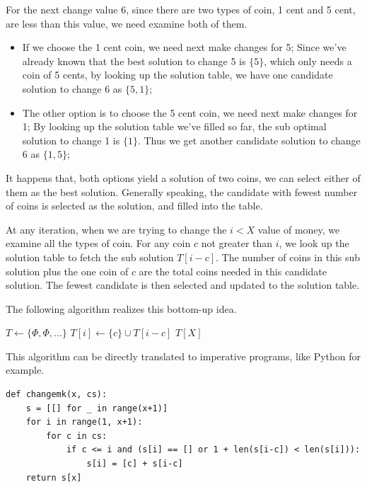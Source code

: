 \documentclass[UTF8]{article}
\begin{document}
For the next change value 6, since there are two types of coin, 1 cent
and 5 cent, are less than this value, we need examine both of them.
\begin{itemize}
\item If we choose the 1 cent coin, we need next make changes for 5; Since
we've already known that the best solution to change 5 is $\{ 5 \}$,
which only needs a coin of 5 cents, by looking up the solution table,
we have one candidate solution to change 6 as $\{5, 1\}$;
\item The other option is to choose the 5 cent coin, we need next make
changes for 1; By looking up the solution table we've filled so far,
the sub optimal solution to change 1 is $\{ 1 \}$. Thus we get another
candidate solution to change 6 as $\{1, 5\}$;
\end{itemize}

It happens that, both options yield a solution of two coins, we can
select either of them as the best solution. Generally speaking, the
candidate with fewest number of coins is selected as the solution,
and filled into the table.

At any iteration, when we are trying to change the $i < X$ value of money,
we examine all the types of coin. For any coin $c$ not greater than $i$,
we look up the solution table to fetch the sub solution $T[i-c]$. The
number of coins in this sub solution plus the one coin of $c$ are the
total coins needed in this candidate solution. The fewest candidate
is then selected and updated to the solution table.

The following algorithm realizes this bottom-up idea.

\begin{algorithmic}[1]
  \State $T \gets \{ \Phi, \Phi, ... \}$
        \State $T[i] \gets \{ c \} \cup T[i-c]$
      \EndIf
    \EndFor
  \EndFor
  \State \Return $T[X]$
\EndFunction
\end{algorithmic}

This algorithm can be directly translated to imperative programs,
like Python for example.

\lstset{language=Python}
\begin{lstlisting}
def changemk(x, cs):
    s = [[] for _ in range(x+1)]
    for i in range(1, x+1):
        for c in cs:
            if c <= i and (s[i] == [] or 1 + len(s[i-c]) < len(s[i])):
                s[i] = [c] + s[i-c]
    return s[x]
\end{lstlisting}
\end{document}
